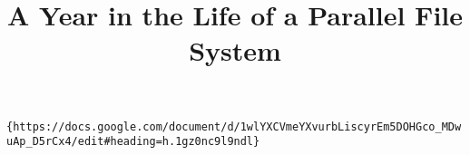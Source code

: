 \documentclass[conference]{IEEEtran}
\begin{document}
\title{A Year in the Life of a Parallel File System}

\begin{comment}

\author{\IEEEauthorblockN{Glenn K. Lockwood, Teng Wang, Suren Byna, Nicholas J. Wright}
\IEEEauthorblockA{Lawrence Berkeley National Laboratory\\\{glock,tengwang,sbyna,njwright\}@lbl.gov
}
\and
\IEEEauthorblockN{Shane Snyder, Philip Carns}
\IEEEauthorblockA{Argonne National Laboratory\\
\{ssnyder,carns\}@mcs.anl.gov}
}
\end{comment}

\newcommand{\tokio}{TOKIO\xspace}
\newcommand{\tokiolong}{Total Knowledge of I/O\xspace}
\newcommand{\nersc}{NERSC\xspace}
\newcommand{\nersclong}{National Energy Research Scientific Computing Center\xspace}
\newcommand{\alcf}{ALCF\xspace}
\newcommand{\alcflong}{Argonne Leadership Computing Facility\xspace}
\newcommand{\cori}{Cori\xspace}
\newcommand{\edison}{Edison\xspace}
\newcommand{\mira}{Mira\xspace}
\newcommand{\mirafsone}{mira-fs1\xspace}
\newcommand{\scratchone}{scratch1\xspace}
\newcommand{\scratchtwo}{scratch2\xspace}
\newcommand{\scratchthree}{scratch3\xspace}
\newcommand{\cscratch}{cscratch\xspace}

\maketitle

\verb+{https://docs.google.com/document/d/1wlYXCVmeYXvurbLiscyrEm5DOHGco_MDwuAp_D5rCx4/edit#heading=h.1gz0nc9l9ndl}+






















\end{document}
